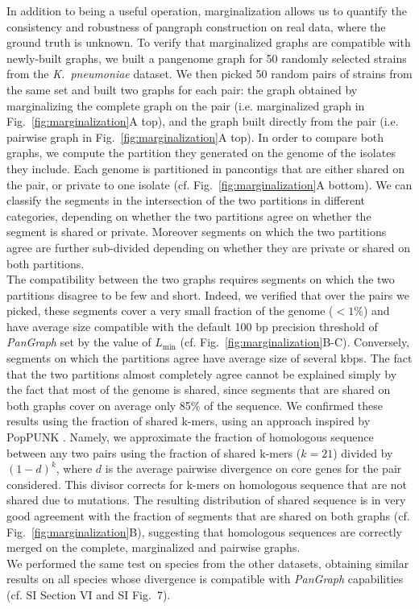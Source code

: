 \documentclass[aps,rmp,preprint,superscriptaddress,10pt,linenumbers]{revtex4-1}
\newcommand{\Lthr}{L_{\min}}
\newcommand{\SImarginalize}{VI}
\newcommand{\SIfigMarg}{7}
\begin{document}
In addition to being a useful operation, marginalization allows us to quantify the consistency and robustness of pangraph construction on real data, where the ground truth is unknown.
To verify that marginalized graphs are compatible with newly-built graphs, we built a pangenome graph for 50 randomly selected strains from the \textit{K.~pneumoniae} dataset. We then picked 50 random pairs of strains from the same set and built two graphs for each pair: the graph obtained by marginalizing the complete graph on the pair (i.e. marginalized graph in Fig.~\ref{fig:marginalization}A top), and the graph built directly from the pair (i.e. pairwise graph in Fig.~\ref{fig:marginalization}A top).
In order to compare both graphs, we compute the partition they generated on the genome of the isolates they include. Each genome is partitioned in pancontigs that are either shared on the pair, or private to one isolate (cf. Fig.~\ref{fig:marginalization}A bottom). We can classify the segments in the intersection of the two partitions in different categories, depending on whether the two partitions agree on whether the segment is shared or private. Moreover segments on which the two partitions agree are further sub-divided depending on whether they are private or shared on both partitions.\\
The compatibility between the two graphs requires segments on which the two partitions disagree to be few and short. Indeed, we verified that over the pairs we picked, these segments cover a very small fraction of the genome ($<1\%$) and have average size compatible with the default 100 bp precision threshold of \textit{PanGraph} set by the value of $\Lthr$ (cf. Fig.~\ref{fig:marginalization}B-C). Conversely, segments on which the partitions agree have average size of several kbps. The fact that the two partitions almost completely agree cannot be explained simply by the fact that most of the genome is shared, since segments that are shared on both graphs cover on average only 85\% of the sequence. We confirmed these results using the fraction of shared k-mers, using an approach inspired by PopPUNK \cite{lees2019fast}. Namely, we approximate the fraction of homologous sequence between any two pairs using the fraction of shared k-mers ($k=21$) divided by $(1-d)^{k}$, where $d$ is the average pairwise divergence on core genes for the pair considered. This divisor corrects for k-mers on homologous sequence that are not shared due to mutations. The resulting distribution of shared sequence is in very good agreement with the fraction of segments that are shared on both graphs (cf. Fig.~\ref{fig:marginalization}B), suggesting that homologous sequences are correctly merged on the complete, marginalized and pairwise graphs.\\
We performed the same test on species from the other datasets, obtaining similar results on all species whose divergence is compatible with \textit{PanGraph} capabilities (cf. SI Section {\SImarginalize} and SI Fig.~\SIfigMarg).
\end{document}
